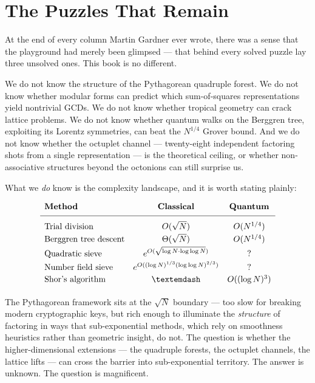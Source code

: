 \documentclass[11pt,twoside,openright]{book}
\theoremstyle{definition}
\theoremstyle{remark}
\begin{document}
\section{The Puzzles That Remain}

At the end of every column Martin Gardner ever wrote, there was a sense that the playground had merely been glimpsed --- that behind every solved puzzle lay three unsolved ones. This book is no different.

We do not know the structure of the Pythagorean quadruple forest. We do not know whether modular forms can predict which sum-of-squares representations yield nontrivial GCDs. We do not know whether tropical geometry can crack lattice problems. We do not know whether quantum walks on the Berggren tree, exploiting its Lorentz symmetries, can beat the $N^{1/4}$ Grover bound. And we do not know whether the octuplet channel --- twenty-eight independent factoring shots from a single representation --- is the theoretical ceiling, or whether non-associative structures beyond the octonions can still surprise us.

What we \textit{do} know is the complexity landscape, and it is worth stating plainly:

\begin{align*}
\begin{array}{lcc}
\textbf{Method} & \textbf{Classical} & \textbf{Quantum} \\[4pt]
\hline
\\[-6pt]
\text{Trial division} & O(\sqrt{N}) & O(N^{1/4}) \\[2pt]
\text{Berggren tree descent} & \Theta(\sqrt{N}) & O(N^{1/4}) \\[2pt]
\text{Quadratic sieve} & e^{O(\sqrt{\log N \cdot \log\log N})} & ? \\[2pt]
\text{Number field sieve} & e^{O((\log N)^{1/3}(\log\log N)^{2/3})} & ? \\[2pt]
\text{Shor's algorithm} & — & O((\log N)^3) \\[2pt]
\end{array}
\end{align*}

The Pythagorean framework sits at the $\sqrt{N}$ boundary --- too slow for breaking modern cryptographic keys, but rich enough to illuminate the \textit{structure} of factoring in ways that sub-exponential methods, which rely on smoothness heuristics rather than geometric insight, do not. The question is whether the higher-dimensional extensions --- the quadruple forests, the octuplet channels, the lattice lifts --- can cross the barrier into sub-exponential territory. The answer is unknown. The question is magnificent.
\end{document}
